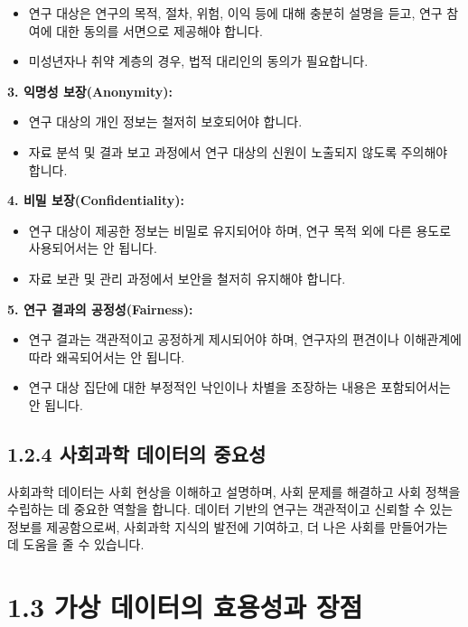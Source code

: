 \documentclass[
  letterpaper,
]{book}
\providecommand{\tightlist}{%
  \setlength{\itemsep}{0pt}\setlength{\parskip}{0pt}}
\begin{document}
\begin{itemize}
\tightlist
\item
  연구 대상은 연구의 목적, 절차, 위험, 이익 등에 대해 충분히 설명을
  듣고, 연구 참여에 대한 동의를 서면으로 제공해야 합니다.
\item
  미성년자나 취약 계층의 경우, 법적 대리인의 동의가 필요합니다.
\end{itemize}

\textbf{3. 익명성 보장(Anonymity):}

\begin{itemize}
\tightlist
\item
  연구 대상의 개인 정보는 철저히 보호되어야 합니다.
\item
  자료 분석 및 결과 보고 과정에서 연구 대상의 신원이 노출되지 않도록
  주의해야 합니다.
\end{itemize}

\textbf{4. 비밀 보장(Confidentiality):}

\begin{itemize}
\tightlist
\item
  연구 대상이 제공한 정보는 비밀로 유지되어야 하며, 연구 목적 외에 다른
  용도로 사용되어서는 안 됩니다.
\item
  자료 보관 및 관리 과정에서 보안을 철저히 유지해야 합니다.
\end{itemize}

\textbf{5. 연구 결과의 공정성(Fairness):}

\begin{itemize}
\tightlist
\item
  연구 결과는 객관적이고 공정하게 제시되어야 하며, 연구자의 편견이나
  이해관계에 따라 왜곡되어서는 안 됩니다.
\item
  연구 대상 집단에 대한 부정적인 낙인이나 차별을 조장하는 내용은
  포함되어서는 안 됩니다.
\end{itemize}

\subsection{1.2.4 사회과학 데이터의
중요성}\label{uxc0acuxd68cuxacfcuxd559-uxb370uxc774uxd130uxc758-uxc911uxc694uxc131}

사회과학 데이터는 사회 현상을 이해하고 설명하며, 사회 문제를 해결하고
사회 정책을 수립하는 데 중요한 역할을 합니다. 데이터 기반의 연구는
객관적이고 신뢰할 수 있는 정보를 제공함으로써, 사회과학 지식의 발전에
기여하고, 더 나은 사회를 만들어가는 데 도움을 줄 수 있습니다.

\section{1.3 가상 데이터의 효용성과
장점}\label{uxac00uxc0c1-uxb370uxc774uxd130uxc758-uxd6a8uxc6a9uxc131uxacfc-uxc7a5uxc810}
\end{document}
